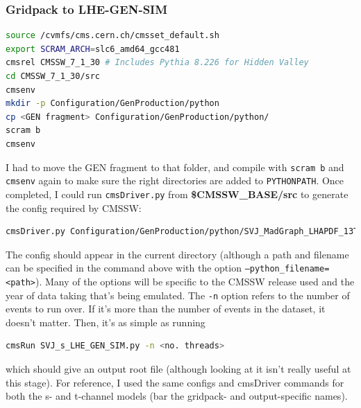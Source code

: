 \subsubsection{Gridpack to LHE-GEN-SIM}

\begin{lstlisting}[belowskip=-0.7cm, language=sh, numbers=none]
source /cvmfs/cms.cern.ch/cmsset_default.sh
export SCRAM_ARCH=slc6_amd64_gcc481
cmsrel CMSSW_7_1_30 # Includes Pythia 8.226 for Hidden Valley
cd CMSSW_7_1_30/src
cmsenv
mkdir -p Configuration/GenProduction/python
cp <GEN fragment> Configuration/GenProduction/python/
scram b
cmsenv
\end{lstlisting}

I had to move the GEN fragment to that folder, and compile with \texttt{scram b} and \texttt{cmsenv} again to make sure the right directories are added to \texttt{PYTHONPATH}. Once completed, I could run \texttt{cmsDriver.py} from \textbf{\$CMSSW\_BASE/src} to generate the config required by CMSSW:

\begin{lstlisting}[belowskip=-0.7cm, language=sh, numbers=none]
cmsDriver.py Configuration/GenProduction/python/SVJ_MadGraph_LHAPDF_13TeV_s_channel_spin1_GEN_frag.py --fileout file:SVJ_s_LHE_GEN_SIM.root --mc --eventcontent RAWSIM,LHE --customise SLHCUpgradeSimulations/Configuration/postLS1Customs.customisePostLS1,Configuration/DataProcessing/Utils.addMonitoring --datatier GEN-SIM,LHE --conditions MCRUN2_71_V1::All --beamspot Realistic50ns13TeVCollision -s LHE,GEN,SIM --magField 38T_PostLS1 --python_filename SVJ_s_LHE_GEN_SIM.py --no_exec -n 250
\end{lstlisting}

The config should appear in the current directory (although a path and filename can be specified in the command above with the option \texttt{--python\_filename=<path>}). Many of the options will be specific to the CMSSW release used and the year of data taking that's being emulated. The \texttt{-n} option refers to the number of events to run over. If it's more than the number of events in the dataset, it doesn't matter. Then, it's as simple as running

\begin{lstlisting}[belowskip=-0.7cm, language=sh, numbers=none]
cmsRun SVJ_s_LHE_GEN_SIM.py -n <no. threads>
\end{lstlisting}

which should give an output root file (although looking at it isn't really useful at this stage). For reference, I used the same configs and cmsDriver commands for both the s- and t-channel models (bar the gridpack- and output-specific names).


